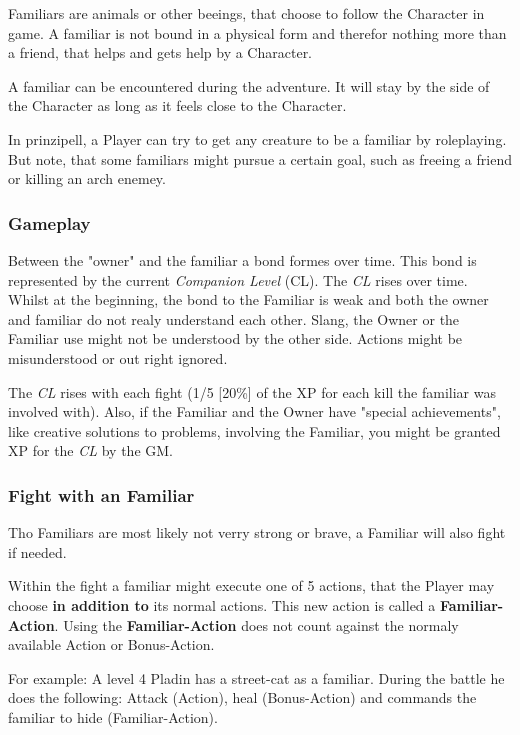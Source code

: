\documentclass[10pt,twoside,twocolumn,openany]{book}
\begin{document}
Familiars are animals or other beeings, that choose to follow the Character in game. A familiar is not bound in a physical form and therefor nothing more than a friend, that helps and gets help by a Character.

A familiar can be encountered during the adventure. It will stay by the side of the Character as long as it feels close to the Character.

In prinzipell, a Player can try to get any creature to be a familiar by roleplaying. But note, that some familiars might pursue a certain goal, such as freeing a friend or killing an arch enemey.

\subsubsection{Gameplay}

Between the "owner" and the familiar a bond formes over time. This bond is represented by the current \textit{Companion Level} (CL). The \textit{CL} rises over time. Whilst at the beginning, the bond to the Familiar is weak and both the owner and familiar do not realy understand each other. Slang, the Owner or the Familiar use might not be understood by the other side. Actions might be misunderstood or out right ignored.

The \textit{CL} rises with each fight (1/5 [20\%] of the XP for each kill the familiar was involved with). Also, if the Familiar and the Owner have "special achievements", like creative solutions to problems, involving the Familiar, you might be granted XP for the \textit{CL} by the GM.

\newpage

\subsubsection{Fight with an Familiar}

Tho Familiars are most likely not verry strong or brave, a Familiar will also fight if needed.

Within the fight a familiar might execute one of 5 actions, that the Player may choose \textbf{in addition to} its normal actions. This new action is called a \textbf{Familiar-Action}.
Using the \textbf{Familiar-Action} does not count against the normaly available Action or Bonus-Action.

For example: A level 4 Pladin has a street-cat as a familiar. During the battle he does the following: Attack (Action), heal (Bonus-Action) and commands the familiar to hide (Familiar-Action).
\end{document}
